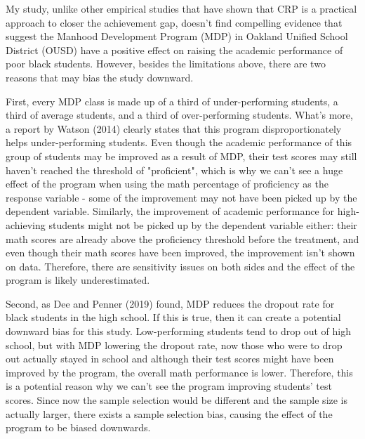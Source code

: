 My study, unlike other empirical studies that have shown that CRP is a practical approach to closer the achievement gap, doesn't find compelling evidence that suggest the Manhood Development Program (MDP) in Oakland Unified School District (OUSD) have a positive effect on raising the academic performance of poor black students. However, besides the limitations above, there are two reasons that may bias the study downward.

First, every MDP class is made up of a third of under-performing students, a third of average students, and a third of over-performing students. What's more, a report by Watson (2014) clearly states that this program disproportionately helps under-performing students. Even though the academic performance of this group of students may be improved as a result of MDP, their test scores may still haven't reached the threshold of "proficient", which is why we can't see a huge effect of the program when using the math percentage of proficiency as the response variable - some of the improvement may not have been picked up by the dependent variable. Similarly, the improvement of academic performance for high-achieving students might not be picked up by the dependent variable either: their math scores are already above the proficiency threshold before the treatment, and even though their math scores have been improved, the improvement isn't shown on data. Therefore, there are sensitivity issues on both sides and the effect of the program is likely underestimated.

Second, as Dee and Penner (2019) found, MDP reduces the dropout rate for black students in the high school. If this is true, then it can create a potential downward bias for this study. Low-performing students tend to drop out of high school, but with MDP lowering the dropout rate, now those who were to drop out actually stayed in school and although their test scores might have been improved by the program, the overall math performance is lower. Therefore, this is a potential reason why we can't see the program improving students' test scores. Since now the sample selection would be different and the sample size is actually larger, there exists a sample selection bias, causing the effect of the program to be biased downwards.

